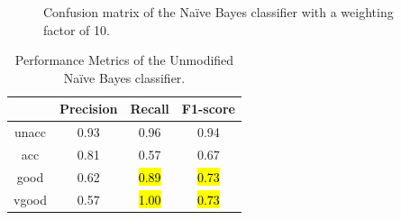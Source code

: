 \documentclass[a4paper]{article}
\begin{document}
\begin{figure} [h!]
  \caption{Confusion matrix of the Naïve Bayes classifier with a weighting factor of 10.} 
  \label{fig:NBCcm_10}
\end{figure}


\begin{table}[h!]
  \centering
  \caption{Performance Metrics of the Unmodified Naïve Bayes classifier.}
  \label{tab:nb_performance_10}
  \begin{tabular}{||cccc||}
  \hline
  \textbf{ } & \textbf{Precision} & \textbf{Recall} & \textbf{F1-score} \\
  \hline \hline
  unacc & 0.93 & 0.96 & 0.94\\ \hline
  acc  & 0.81 & 0.57 & 0.67\\ \hline
  good & 0.62 & \hl{0.89} & \hl{0.73}\\ \hline
  vgood & 0.57 & \hl{1.00} & \hl{0.73}\\ \hline
  \end{tabular}
\end{table}
\end{document}
